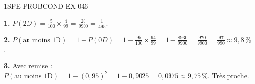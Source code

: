 \begin{corrige}{1SPE-PROBCOND-EX-046}

\textbf{1.} $P(2D) = \frac{5}{100}\times\frac{4}{99} = \frac{20}{9900} = \frac{1}{495}$.

\textbf{2.} $P(\text{au moins 1D}) = 1 - P(0D) = 1 - \frac{95}{100}\times\frac{94}{99} = 1 - \frac{8930}{9900} = \frac{970}{9900} = \frac{97}{990} \approx 9{,}8\,\%$.

\textbf{3.} Avec remise : $P(\text{au moins 1D}) = 1 - (0{,}95)^2 = 1 - 0{,}9025 = 0{,}0975 \approx 9{,}75\,\%$. Très proche.

\end{corrige}
